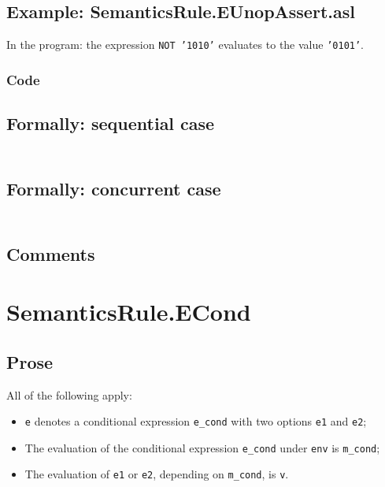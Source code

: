 \documentclass{book}
\begin{document}
  \subsection{Example: SemanticsRule.EUnopAssert.asl}
    In the program:
    the expression \texttt{NOT '1010'} evaluates to the value \texttt{'0101'}.

  \subsubsection{Code}

  \subsection{Formally: sequential case}
  \begin{align}
  \end{align} 

  \subsection{Formally: concurrent case}
  \begin{align}
  \end{align} 

  \subsection{Comments}

\section{SemanticsRule.ECond \label{sec:SemanticsRule.ECond}}

  \subsection{Prose}
  All of the following apply:
  \begin{itemize}
  \item \texttt{e} denotes a conditional expression \texttt{e\_cond} with two options \texttt{e1} and \texttt{e2};
  \item The evaluation of the conditional expression \texttt{e\_cond} under \texttt{env} is \texttt{m\_cond};
  \item The evaluation of \texttt{e1} or \texttt{e2}, depending on \texttt{m\_cond}, is \texttt{v}.
  \end{itemize}
\end{document}
